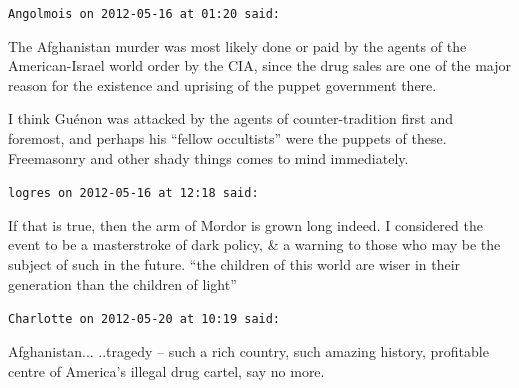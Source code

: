 \begin{footnotesize}
\begin{sffamily}
\hfill

\texttt{Angolmois on 2012-05-16 at 01:20 said:}

The Afghanistan murder was most likely done or paid by the agents of the American-Israel world order by the CIA, since the drug sales are one of the major reason for the existence and uprising of the puppet government there.

I think Guénon was attacked by the agents of counter-tradition first and foremost, and perhaps his ``fellow occultists'' were the puppets of these. Freemasonry and other shady things comes to mind immediately.

\hfill

\texttt{logres on 2012-05-16 at 12:18 said:}

If that is true, then the arm of Mordor is grown long indeed. I considered the event to be a masterstroke of dark policy, \& a warning to those who may be the subject of such in the future. ``the children of this world are wiser in their generation than the children of light''

\hfill

\texttt{Charlotte on 2012-05-20 at 10:19 said:}

Afghanistan... ..tragedy -- such a rich country, such amazing history, profitable centre of America's illegal drug cartel, say no more.

\hfill

\end{sffamily}
\end{footnotesize}

